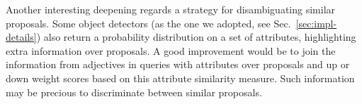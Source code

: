 Another interesting deepening regards a strategy for disambiguating
similar proposals. Some object detectors (as the one we adopted, see
Sec.~\ref{sec:impl-details}) also return a probability distribution on
a set of attributes, highlighting extra information over proposals. A
good improvement would be to join the information from adjectives in
queries with attributes over proposals and up or down weight scores
based on this attribute similarity measure. Such information may be
precious to discriminate between similar proposals.
